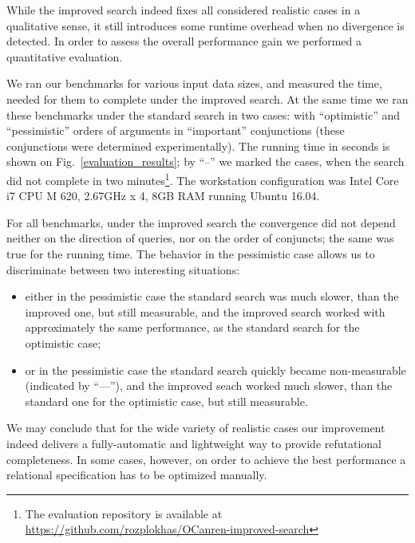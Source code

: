 

While the improved search indeed fixes all considered realistic cases in a qualitative sense, it still introduces some runtime
overhead when no divergence is detected. In order to assess the overall performance gain we performed a quantitative
evaluation.

We ran our benchmarks for various input data sizes, and measured the time, needed for them to complete under the improved search. At the same time
we ran these benchmarks under the standard search in two cases: with ``optimistic'' and ``pessimistic'' orders of arguments in ``important'' conjunctions
(these conjunctions were determined experimentally). The running time in seconds is shown on Fig.~\ref{evaluation_results}; by
``--'' we marked the cases, when the search did not complete in two minutes\footnote{The evaluation repository is available at \url{https://github.com/rozplokhas/OCanren-improved-search}}.
The workstation configuration was Intel Core i7 CPU M 620, 2.67GHz x 4, 8GB RAM running Ubuntu 16.04.

For all benchmarks, under the improved search the convergence did not depend neither on the direction of queries, nor on the order of conjuncts; the same was true for
the running time. The behavior in the pessimistic case allows us to discriminate between two interesting situations:

\begin{itemize}
\item either in the pessimistic case the standard search was much slower, than the improved one, but still measurable, and the improved search worked with approximately the
same performance, as the standard search for the optimistic case;
  
\item or in the pessimistic case the standard search quickly became non-measurable (indicated by ``---''), and the improved seach worked much slower, than the standard one for the
optimistic case, but still measurable.
\end{itemize}

We may conclude that for the wide variety of realistic cases our improvement indeed delivers a fully-automatic and lightweight way to provide refutational completeness. In some cases,
however, on order to achieve the best performance a relational specification has to be optimized manually.

